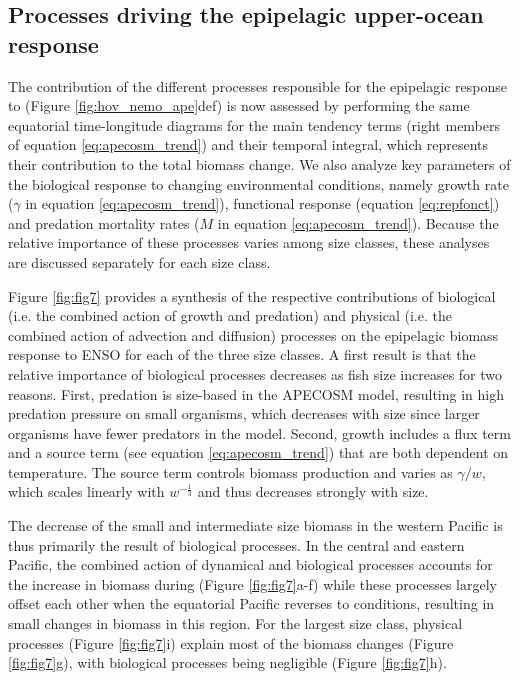 \subsection{Processes driving the epipelagic upper-ocean response}

The contribution of the different processes responsible for the epipelagic response to \nino{} (Figure \ref{fig:hov_nemo_ape}def) is now assessed by performing the same equatorial time-longitude diagrams for the main tendency terms (right members of equation \ref{eq:apecosm_trend}) and their temporal integral, which represents their contribution to the total biomass change. We also analyze key parameters of the biological response to changing environmental conditions, namely growth rate ($\gamma$ in equation \ref{eq:apecosm_trend}), functional response (equation \ref{eq:repfonct}) and predation mortality rates ($M$ in equation \ref{eq:apecosm_trend}). Because the relative importance of these processes varies among size classes, these analyses are discussed separately for each size class.

Figure \ref{fig:fig7} provides a synthesis of the respective contributions of biological (i.e. the combined action of growth and predation) and physical (i.e. the combined action of advection and diffusion) processes on the epipelagic biomass response to ENSO for each of the three size classes. A first result is that the relative importance of biological processes decreases as fish size increases for two reasons. First, predation is size-based in the APECOSM model, resulting in high predation pressure on small organisms, which decreases with size since larger organisms have fewer predators in the model. Second, growth includes a flux term and a source term (see equation \ref{eq:apecosm_trend}) that are both dependent on temperature. The source term controls biomass production and varies as ${\gamma}/{w}$, which scales linearly with $w^{-\frac{1}{3}}$ and thus decreases strongly with size.

The decrease of the small and intermediate size biomass in the western Pacific is thus primarily the result of biological processes. In the central and eastern Pacific, the combined action of dynamical and biological processes accounts for the increase in biomass during \nino{} (Figure \ref{fig:fig7}a-f) while these processes largely offset each other when the equatorial Pacific reverses to \nina{} conditions, resulting in small  changes in biomass in this region. For the largest size class, physical processes (Figure \ref{fig:fig7}i) explain most of the biomass changes (Figure \ref{fig:fig7}g), with biological processes being negligible (Figure \ref{fig:fig7}h).

